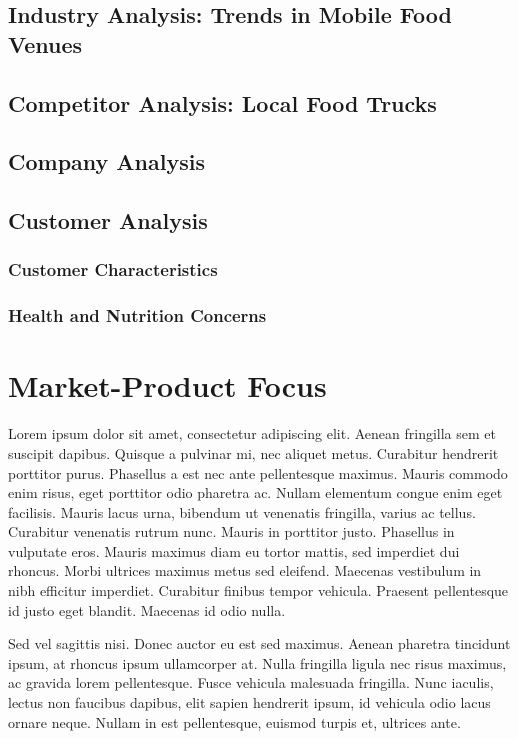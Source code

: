 \documentclass[12pt, letterpaper]{article}
\begin{document}
\subsection{Industry Analysis: Trends in Mobile Food Venues}


\subsection{Competitor Analysis: Local Food Trucks}
\subsection{Company Analysis}
\subsection{Customer Analysis}
\subsubsection{Customer Characteristics}
\subsubsection{Health and Nutrition Concerns}

\section{Market-Product Focus}
Lorem ipsum dolor sit amet, consectetur adipiscing elit. Aenean fringilla sem et suscipit dapibus. Quisque a pulvinar mi, nec aliquet metus. Curabitur hendrerit porttitor purus. Phasellus a est nec ante pellentesque maximus. Mauris commodo enim risus, eget porttitor odio pharetra ac. Nullam elementum congue enim eget facilisis. Mauris lacus urna, bibendum ut venenatis fringilla, varius ac tellus. Curabitur venenatis rutrum nunc. Mauris in porttitor justo. Phasellus in vulputate eros. Mauris maximus diam eu tortor mattis, sed imperdiet dui rhoncus. Morbi ultrices maximus metus sed eleifend. Maecenas vestibulum in nibh efficitur imperdiet. Curabitur finibus tempor vehicula. Praesent pellentesque id justo eget blandit. Maecenas id odio nulla.

Sed vel sagittis nisi. Donec auctor eu est sed maximus. Aenean pharetra tincidunt ipsum, at rhoncus ipsum ullamcorper at. Nulla fringilla ligula nec risus maximus, ac gravida lorem pellentesque. Fusce vehicula malesuada fringilla. Nunc iaculis, lectus non faucibus dapibus, elit sapien hendrerit ipsum, id vehicula odio lacus ornare neque. Nullam in est pellentesque, euismod turpis et, ultrices ante.
\end{document}
